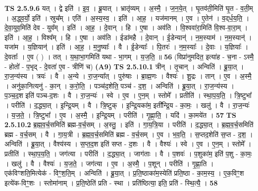 \documentclass[17pt]{extarticle}
\begin{document}
                  \newline
                                \textbf{ TS 2.5.9.6} \newline
                  यत् । द्वे इति॑ । इ॒व॒ । ब्रू॒यात् । भ्रातृ॑व्यम् । अ॒स्मै॒ । ज॒न॒ये॒त् । घृ॒तव॑ती॒मिति॑ घृ॒त - व॒ती॒म् । अ॒द्ध्व॒र्यो॒ इति॑ । स्रुच᳚म् । एति॑ । अ॒स्य॒स्व॒ । इति॑ । आ॒ह॒ । यज॑मानम् । ए॒व । ए॒तेन॑ । व॒द्‌र्ध॒य॒ति॒ । दे॒वा॒युव॒मिति॑ देव - युव᳚म् । इति॑ । आ॒ह॒ । दे॒वान् । हि । ए॒षा । अव॑ति । वि॒श्ववा॑रा॒मिति॑ वि॒श्व-वा॒रा॒म् । इति॑ । आ॒ह॒ । विश्व᳚म् । हि । ए॒षा । अव॑ति । ईडा॑महै । दे॒वान् । ई॒डेन्यान्॑ । न॒म॒स्याम॑ । न॒म॒स्यान्॑ । यजा॑म । य॒ज्ञियान्॑ । इति॑ । आ॒ह॒ । म॒नु॒ष्याः᳚ । वै । ई॒डेन्याः᳚ । पि॒तरः॑ । न॒म॒स्याः᳚ । दे॒वाः । य॒ज्ञियाः᳚ । दे॒वताः᳚ । ए॒व ( ) । तत् । य॒था॒भा॒गमिति॑ यथा - भा॒गम् । य॒ज॒ति॒ ॥ \textbf{  56 } \newline
                  \newline
                      (विप्रा॑नुमदित॒ इत्या॑ह - च॒ना - ऽस्मै॒ - होतो॑ - प॒भृद् - दे॒वता॑ ए॒व - त्रीणि॑ च)  \textbf{(A9)} \newline \newline
                                \textbf{ TS 2.5.10.1} \newline
                  त्रीन् । तृ॒चान् । अन्विति॑ । ब्रू॒या॒त् । रा॒ज॒न्य॑स्य । त्रयः॑ । वै । अ॒न्ये । रा॒ज॒न्या᳚त् । पुरु॑षाः । ब्रा॒ह्म॒णः । वैश्यः॑ । शू॒द्रः । तान् । ए॒व । अ॒स्मै॒ । अनु॑का॒नित्यनु॑ - का॒न् । क॒रो॒ति॒ । पञ्च॑द॒शेति॒ पञ्च॑ - द॒श॒ । अन्विति॑ । ब्रू॒या॒त् । रा॒ज॒न्य॑स्य । प॒ञ्च॒द॒श इति॑ पञ्च-द॒शः । वै । रा॒ज॒न्यः॑ । स्वे । ए॒व । ए॒न॒म् । स्तोमे᳚ । प्रतीति॑ । स्था॒प॒य॒ति॒ । त्रि॒ष्टुभा᳚ । परीति॑ । द॒द्ध्या॒त् । इ॒न्द्रि॒यम् । वै । त्रि॒ष्टुक् । इ॒न्द्रि॒यका॑म॒ इती᳚न्द्रि॒य - का॒मः॒ । खलु॑ । वै । रा॒ज॒न्यः॑ । य॒ज॒ते॒ । त्रि॒ष्टुभा᳚ । ए॒व । अ॒स्मै॒ । इ॒न्द्रि॒यम् । परीति॑ । गृ॒ह्णा॒ति॒ । यदि॑ । का॒मये॑त । \textbf{  57} \newline
                  \newline
                                \textbf{ TS 2.5.10.2} \newline
                  ब्र॒ह्म॒व॒र्च॒समिति॑ ब्रह्म-व॒र्च॒सम् । अ॒स्तु॒ । इति॑ । गा॒य॒त्रि॒या । परीति॑ । द॒द्ध्या॒त् । ब्र॒ह्म॒व॒र्च॒समिति॑ ब्रह्म - व॒र्च॒सम् । वै । गा॒य॒त्री । ब्र॒ह्म॒व॒र्च॒समिति॑ ब्रह्म - व॒र्च॒सम् । ए॒व । भ॒व॒ति॒ । स॒प्तद॒शेति॑ स॒प्त - द॒श॒ । अन्विति॑ । ब्रू॒या॒त् । वैश्य॑स्य । स॒प्त॒द॒श इति॑ सप्त - द॒शः । वै । वैश्यः॑ । स्वे । ए॒व । ए॒न॒म् । स्तोमे᳚ । प्रतीति॑ । स्था॒प॒य॒ति॒ । जग॑त्या । परीति॑ । द॒द्ध्या॒त् । जाग॑ताः । वै । प॒शवः॑ । प॒शुका॑म॒ इति॑ प॒शु - का॒मः॒ । खलु॑ । वै । वैश्यः॑ । य॒ज॒ते॒ । जग॑त्या । ए॒व । अ॒स्मै॒ । प॒शून् । परीति॑ । गृ॒ह्णा॒ति । एक॑विꣳशति॒मित्येक॑ - विꣳ॒॒श॒ति॒म् । अन्विति॑ । ब्रू॒या॒त् । प्र॒ति॒ष्ठाका॑म॒स्येति॑ प्रति॒ष्ठा - का॒म॒स्य॒ । ए॒क॒विꣳ॒॒श इत्ये॑क-विꣳ॒॒शः । स्तोमा॑नाम् । प्र॒ति॒ष्ठेति॑ प्रति - स्था । प्रति॑ष्ठित्या॒ इति॒ प्रति॑ - स्थि॒त्यै॒ । \textbf{  58} \newline
\end{document}
